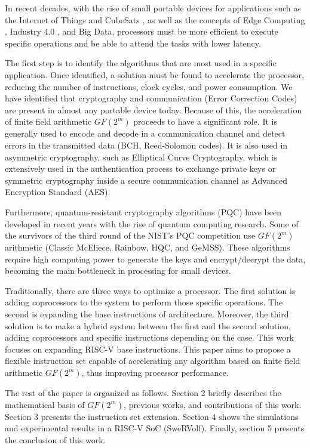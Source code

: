 In recent decades, with the rise of small portable devices for applications such as the Internet of Things \cite{5579543}
and CubeSats \cite{heidt2000cubesat}, as well as the concepts of Edge Computing \cite{7488250}, Industry 4.0 \cite{lasi2014industry}, 
and Big Data, processors must be more efficient to execute specific operations and be able to attend the tasks with lower latency.


The first step is to identify the algorithms that are most used in a specific application. 
Once identified, a solution must be found to accelerate the processor, reducing the number of instructions, 
clock cycles, and power consumption. We have identified that cryptography and communication 
(Error Correction Codes) are present in almost any portable device today. 
Because of this, the acceleration of finite field arithmetic $GF(2^m)$ proceeds to have a significant role. 
It is generally used to encode and decode in a communication channel and detect errors in the transmitted data 
(BCH, Reed-Solomon codes). It is also used in asymmetric cryptography, such as Elliptical Curve Cryptography, 
which is extensively used in the authentication process to exchange private keys or symmetric cryptography 
inside a secure communication channel as Advanced Encryption Standard (AES).


Furthermore, quantum-resistant cryptography algorithms (PQC) have been developed in recent years 
with the rise of quantum computing research. Some of the survivors of the third round of the NIST's PQC competition 
use $GF(2^m)$ arithmetic (Classic McEliece, Rainbow, HQC, and GeMSS). These algorithms require high computing power 
to generate the keys and encrypt/decrypt the data, becoming the main bottleneck in processing for small devices.


Traditionally, there are three ways to optimize a processor. The first solution is adding coprocessors 
to the system to perform those specific operations. The second is expanding the base instructions 
of architecture. Moreover, the third solution is to make a hybrid system between the first and 
the second solution, adding coprocessors and specific instructions depending on the case. 
This work focuses on expanding RISC-V base instructions. This paper aims to propose a flexible instruction set 
capable of accelerating any algorithm based on finite field arithmetic $GF(2^m)$, thus improving processor performance.


The rest of the paper is organized as follows. Section 2 briefly describes the mathematical basis of $GF(2^m)$, previous works, 
and contributions of this work. Section 3 presents the instruction set extension. Section 4 shows the simulations and 
experimental results in a RISC-V SoC (SweRVolf). Finally, section 5 presents the conclusion of this work.


